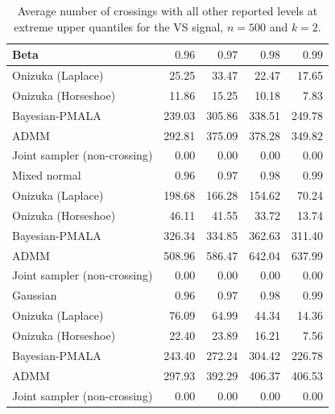 \begin{table}[!htbp]
\centering
\small
\caption{Average number of crossings with all other reported levels at extreme upper quantiles for the VS signal, $n=500$ and $k=2$.}
\label{tab:vs_ext_upper_cross_all}
\begin{tabular}{lrrrr}
\toprule
Beta & $0.96$ & $0.97$ & $0.98$ & $0.99$ \\
\midrule
Onizuka (Laplace) & 25.25 & 33.47 & 22.47 & 17.65 \\
Onizuka (Horseshoe) & 11.86 & 15.25 & 10.18 & 7.83 \\
Bayesian-PMALA & 239.03 & 305.86 & 338.51 & 249.78 \\
ADMM & 292.81 & 375.09 & 378.28 & 349.82 \\
Joint sampler (non-crossing) & 0.00 & 0.00 & 0.00 & 0.00 \\
\midrule
Mixed normal & $0.96$ & $0.97$ & $0.98$ & $0.99$ \\
\midrule
Onizuka (Laplace) & 198.68 & 166.28 & 154.62 & 70.24 \\
Onizuka (Horseshoe) & 46.11 & 41.55 & 33.72 & 13.74 \\
Bayesian-PMALA & 326.34 & 334.85 & 362.63 & 311.40 \\
ADMM & 508.96 & 586.47 & 642.04 & 637.99 \\
Joint sampler (non-crossing) & 0.00 & 0.00 & 0.00 & 0.00 \\
\midrule
Gaussian & $0.96$ & $0.97$ & $0.98$ & $0.99$ \\
\midrule
Onizuka (Laplace) & 76.09 & 64.99 & 44.34 & 14.36 \\
Onizuka (Horseshoe) & 22.40 & 23.89 & 16.21 & 7.56 \\
Bayesian-PMALA & 243.40 & 272.24 & 304.42 & 226.78 \\
ADMM & 297.93 & 392.29 & 406.37 & 406.53 \\
Joint sampler (non-crossing) & 0.00 & 0.00 & 0.00 & 0.00 \\
\bottomrule
\end{tabular}
\end{table}
